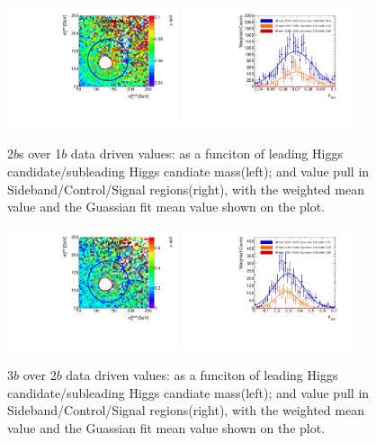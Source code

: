 \begin{figure}[htbp!]
\begin{center}
\includegraphics[width=0.45\textwidth,angle=-90]{figures/boosted/AppendixMuqcdstudy/TwoTag_split_Incl_mH0H1.pdf}
\includegraphics[width=0.45\textwidth,angle=-90]{figures/boosted/AppendixMuqcdstudy/TwoTag_split_Incl_mH0H1_pull.pdf}
\caption{2$b$s over 1$b$ data driven \muqcd values: \muqcd as a funciton of leading Higgs candidate/subleading Higgs candiate mass(left); and \muqcd value pull in Sideband/Control/Signal regions(right), with the weighted mean value and the Guassian fit mean value shown on the plot.}
\label{fig:app-muqcd-2bs}
\end{center}
\end{figure}

\begin{figure}[htbp!]
\begin{center}
\includegraphics[width=0.45\textwidth,angle=-90]{figures/boosted/AppendixMuqcdstudy/ThreeTag_Incl_mH0H1.pdf}
\includegraphics[width=0.45\textwidth,angle=-90]{figures/boosted/AppendixMuqcdstudy/ThreeTag_Incl_mH0H1_pull.pdf}
\caption{3$b$ over 2$b$ data driven \muqcd values: \muqcd as a funciton of leading Higgs candidate/subleading Higgs candiate mass(left); and \muqcd value pull in Sideband/Control/Signal regions(right), with the weighted mean value and the Guassian fit mean value shown on the plot.}
\label{fig:app-muqcd-3b}
\end{center}
\end{figure}


